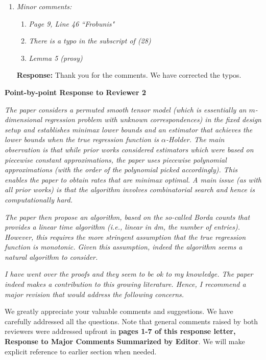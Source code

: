 \documentclass[11pt]{article}
\theoremstyle{plain}
\theoremstyle{definition}
\begin{document}
\begin{enumerate}[wide, labelwidth=!, labelindent=0pt]
     
     
     
     
     
     
     \item \textit{Minor comments: }
     \begin{enumerate}
     \item \textit{Page 9, Line 46 ``Frobunis"}
        
         
    \item \textit{There is a typo in the subscript of (28)} 
    \item \textit{Lemma 5 (prosy)}
\end{enumerate}
\textbf{Response:} Thank you for the comments.  We have corrected the typos. 
\end{enumerate}



\newpage
\begin{center}
    \textbf{Point-by-point Response to Reviewer 2}
\end{center}

 \emph{The paper considers a permuted smooth tensor model (which is essentially an $m$-dimensional regression problem with unknown correspondences) in the fixed design setup and establishes minimax lower bounds and an estimator that achieves the lower bounds when the true regression function is $\alpha$-Holder. The main observation is that while prior works considered estimators which were based on piecewise constant approximations, the paper uses piecewise polynomial approximations (with the order of the polynomial picked accordingly). This enables the paper to obtain rates that are minimax optimal. A main issue (as with all prior works) is that the algorithm involves combinatorial search and hence is computationally hard.}
 
  \emph{The paper then propose an algorithm, based on the so-called Borda counts that provides a linear time algorithm (i.e., linear in dm, the number of entries). However, this requires the more stringent assumption that the true regression function is monotonic. Given this assumption, indeed the algorithm seems a natural algorithm to consider.}
  
 \emph{I have went over the proofs and they seem to be ok to my knowledge. The paper indeed makes a contribution to this growing literature. Hence, I recommend a major revision that would address the following concerns.}

We greatly appreciate your valuable comments and suggestions. We have carefully addressed all the questions. Note that general comments raised by both reviewers were addressed upfront in {\bf pages 1-7 of this response letter, Response to Major Comments Summarized by Editor}. We will make explicit reference to earlier section when needed. 
\end{document}
